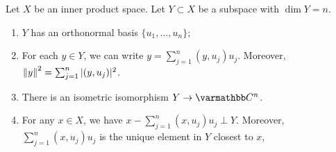 \begin{theorem}
    Let $X$ be an inner product space. Let $Y \subset X$ be a subspace with $\dim Y = n$.
    \begin{enumerate}[label = (\arabic*),itemsep=1pt,topsep=3pt]
        \item $Y$ has an orthonormal basis $\{u_1,...,u_n\}$;
        \item For each $y \in Y$, we can write $y = \sum_{j = 1}^n (y,u_j)u_j$. Moreover, $\left\lVert y \right\rVert^2 = \sum_{j = 1}^n |(y,u_j)|^2$.
        \item There is an isometric isomorphism $Y \rightarrow \bfC^n$.
        \item For any $x \in X$, we have $x- \sum_{j = 1}^n (x,u_j)u_j \perp Y$. Moreover, $\sum_{j = 1}^n (x,u_j)u_j$ is the unique element in $Y$ closest to $x$,
    \end{enumerate}
\end{theorem}
